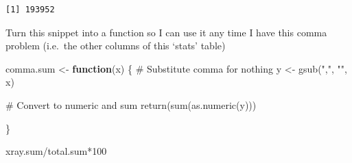 \documentclass[
  letterpaper,
  DIV=11,
  numbers=noendperiod]{scrartcl}
\newenvironment{Shaded}{\begin{snugshade}}{\end{snugshade}}
\newcommand{\CommentTok}[1]{\textcolor[rgb]{0.37,0.37,0.37}{#1}}
\newcommand{\ControlFlowTok}[1]{\textcolor[rgb]{0.00,0.23,0.31}{\textbf{#1}}}
\newcommand{\DecValTok}[1]{\textcolor[rgb]{0.68,0.00,0.00}{#1}}
\newcommand{\FunctionTok}[1]{\textcolor[rgb]{0.28,0.35,0.67}{#1}}
\newcommand{\NormalTok}[1]{\textcolor[rgb]{0.00,0.23,0.31}{#1}}
\newcommand{\OtherTok}[1]{\textcolor[rgb]{0.00,0.23,0.31}{#1}}
\newcommand{\SpecialCharTok}[1]{\textcolor[rgb]{0.37,0.37,0.37}{#1}}
\newcommand{\StringTok}[1]{\textcolor[rgb]{0.13,0.47,0.30}{#1}}
\begin{document}
\begin{Shaded}
\end{Shaded}

\begin{verbatim}
[1] 193952
\end{verbatim}

Turn this snippet into a function so I can use it any time I have this
comma problem (i.e.~the other columns of this `stats' table)

\begin{Shaded}
\begin{Highlighting}[]
\NormalTok{comma.sum }\OtherTok{\textless{}{-}} \ControlFlowTok{function}\NormalTok{(x) \{}
  \CommentTok{\# Substitute comma for nothing}
\NormalTok{  y }\OtherTok{\textless{}{-}} \FunctionTok{gsub}\NormalTok{(}\StringTok{","}\NormalTok{, }\StringTok{""}\NormalTok{, x)}

  \CommentTok{\# Convert to numeric and sum}
  \FunctionTok{return}\NormalTok{(}\FunctionTok{sum}\NormalTok{(}\FunctionTok{as.numeric}\NormalTok{(y)))}

\NormalTok{\}}
\end{Highlighting}
\end{Shaded}

\begin{Shaded}
\end{Shaded}

\begin{Shaded}
\begin{Highlighting}[]
\NormalTok{xray.sum}\SpecialCharTok{/}\NormalTok{total.sum}\SpecialCharTok{*}\DecValTok{100}
\end{Highlighting}
\end{Shaded}
\end{document}
